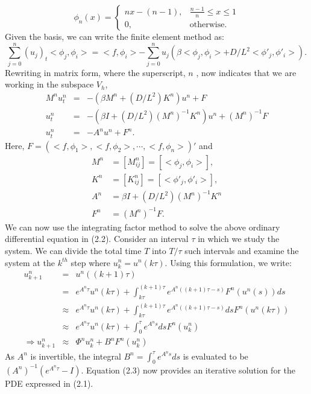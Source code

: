 \begin{equation*}
    \phi_n(x) = 
\begin{cases}
    nx - (n-1) ,& \frac{n-1}{n} \leq x \leq 1\\
    0,              & \text{otherwise}.
\end{cases}
\end{equation*}
Given the basis, we can write the finite element method as:
$$\sum_{j=0}^{n}(u_j)_t< \phi _j, \phi _i> = <f, \phi _i> - \sum_{j=0}^{n}u_j( \beta <\phi _j, \phi _i> + D/L^2 <\phi' _j, \phi' _i> ).$$ 
Rewriting in matrix form, where the superscript, $n$ , now indicates that we are working in the subspace $V_h$, 
\begin{eqnarray}
M^n u_t^n &=& -(\beta M^n + (D/L^2)K^n)u^n + F \nonumber \\
u_t^n &=& -(\beta I + (D/L^2)(M^n)^{-1}K^n)u^n + (M^n)^{-1} F \nonumber \\
u_t^n &=& -A^nu^n + F^n.
\end{eqnarray}
Here, $F = \left(<f, \phi_1>, <f, \phi_2>, \cdots, <f, \phi_n> \right )'$ and 
\begin{align*}
M^n &= [M^n_{ij}] = [<\phi_j, \phi_i>],\\
K^n &= [K^n_{ij}] = [<\phi'_j, \phi'_i>],\\
A^n &= \beta I + (D/L^2)(M^n)^{-1}K^n\\
F^n &= (M^n)^{-1} F.
\end{align*}
We can now use the integrating factor method to solve the above ordinary differential equation in (2.2). Consider an interval $\tau$ in which we study the system. We can divide the total time $T$ into $T/\tau$ such intervals and examine the system at the $k^{th}$ step where $u_k^n = u^n(k\tau )$. Using this formulation, we write:
\begin{eqnarray}
u^n_{k+1} &=& u^n((k+1)\tau ) \nonumber \\
&=& e^{A^n\tau }u^n(k\tau ) + \int_{k\tau }^{(k + 1)\tau } e^{A^n((k+1)\tau -s)}F^n(u^n(s))ds \nonumber \\ 
&\approx& e^{A^n\tau }u^n(k\tau ) + \int_{k\tau }^{(k + 1)\tau } e^{A^n((k+1)\tau -s)}dsF^n(u^n(k\tau )) \nonumber \\
&\approx& e^{A^n\tau }u^n(k\tau ) + \int_{0}^{\tau } e^{A^ns}dsF^n(u^n_k) \nonumber\\
\Rightarrow u^n_{k+1} &\approx& \Phi^n u^n_k + B^nF^n(u^n_k)
\end{eqnarray}
As $A^n$ is invertible, the integral $B^n = \int_{0}^{\tau } e^{A^ns}ds$ is evaluated to be $(A^n)^{-1}(e^{A^n\tau} - I)$. Equation (2.3) now provides an iterative solution for the PDE expressed in (2.1).


